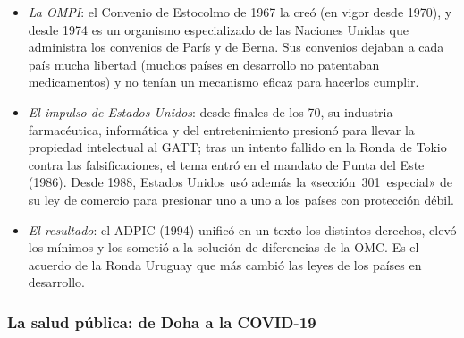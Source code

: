 \documentclass[11pt]{article}
\begin{document}
\begin{itemize}
\item \emph{La OMPI}: el Convenio de Estocolmo de 1967 la creó (en vigor desde 1970), y desde 1974 es un organismo especializado de las Naciones Unidas que administra los convenios de París y de Berna. Sus convenios dejaban a cada país mucha libertad (muchos países en desarrollo no patentaban medicamentos) y no tenían un mecanismo eficaz para hacerlos cumplir.
\item \emph{El impulso de Estados Unidos}: desde finales de los 70, su industria farmacéutica, informática y del entretenimiento presionó para llevar la propiedad intelectual al GATT; tras un intento fallido en la Ronda de Tokio contra las falsificaciones, el tema entró en el mandato de Punta del Este (1986). Desde 1988, Estados Unidos usó además la «sección~301~especial» de su ley de comercio para presionar uno a uno a los países con protección débil.
\item \emph{El resultado}: el ADPIC (1994) unificó en un texto los distintos derechos, elevó los mínimos y los sometió a la solución de diferencias de la OMC. Es el acuerdo de la Ronda Uruguay que más cambió las leyes de los países en desarrollo.
\end{itemize}

\subsubsection{La salud pública: de Doha a la COVID-19}\label{sec:salud}
\end{document}

